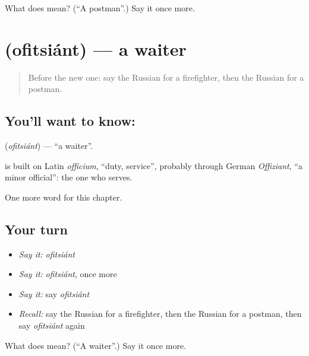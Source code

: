 \begin{tcolorbox}[breakable,colback=teal!4,colframe=teal!35!black,title={Before you move on}]
What does  mean? (\textquotedblleft{}A postman\textquotedblright{}.) Say it once more.
\end{tcolorbox}
\section[\texorpdfstring{\ru{официант} (ofitsiánt)}{официант (ofitsiánt)}]{ (ofitsiánt) — a waiter}

\label{lesson:RU-C109-waiter}



\begin{quote}
Before the new one: say the Russian for a firefighter, then the Russian for a postman.
\end{quote}

\subsection*{You'll want to know: }
\textbf{} (\emph{ofitsiánt}) — \textquotedblleft{}a waiter\textquotedblright{}.

\begin{cousinweb}
\textbf{} is built on Latin \emph{officium}, \textquotedblleft{}duty, service\textquotedblright{}, probably through German \emph{Offiziant}, \textquotedblleft{}a minor official\textquotedblright{}: the one who serves.
\end{cousinweb}

\begin{grammarlens}[title={What you've built}]
One more word for this chapter.
\end{grammarlens}

\subsection*{Your turn}
\begin{itemize}
\raggedright
  \item \emph{Say it:} \emph{ofitsiánt}
  \item \emph{Say it:} \emph{ofitsiánt}, once more
  \item \emph{Say it:} say \emph{ofitsiánt}
  \item \emph{Recall:} say the Russian for a firefighter, then the Russian for a postman, then say \emph{ofitsiánt} again
\end{itemize}

\begin{tcolorbox}[breakable,colback=teal!4,colframe=teal!35!black,title={Before you move on}]
What does  mean? (\textquotedblleft{}A waiter\textquotedblright{}.) Say it once more.
\end{tcolorbox}

